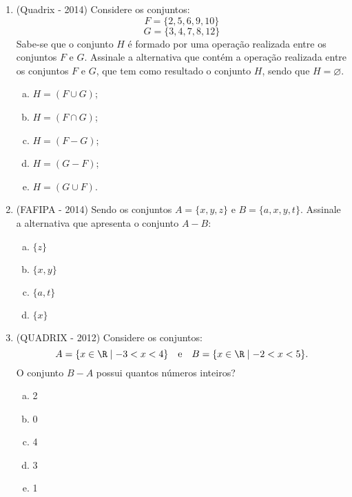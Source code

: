 \begin{enumerate}
  \item (Quadrix - 2014)  Considere os conjuntos:
      \[F = \{2, 5, 6, 9,10 \}\]
      \[G = \{3, 4, 7, 8, 12\}\]
 Sabe-se que o conjunto $H$ é formado por uma operação realizada entre os conjuntos $F$ e $G$. Assinale a alternativa que  contém a operação realizada entre os conjuntos $F$ e $G$, que tem como resultado o conjunto $H$, sendo que $H = \varnothing$.
 \begin{enumerate}[a)]
  \item $H= (F \cup G)$;
  \item $H= (F \cap G)$;
  \item $H= (F - G)$;
  \item $H= (G - F)$;
  \item $H= (G \cup F)$.
 \end{enumerate}

 \newpage
 \item (FAFIPA - 2014) Sendo os conjuntos $A = \{ x,y,z \}$ e $B =  \{a, x,y,t\}$. Assinale a alternativa que apresenta o conjunto $A - B$:
 \begin{multicols}{5}
 \begin{enumerate}[a)]
  \item $\{ z \}$
  \item $\{ x, y \}$
  \item $\{a, t\}$
  \item  $\{x\}$
 \end{enumerate}
 \end{multicols}

 \item (QUADRIX - 2012) Considere os conjuntos:
  \[ A = \{ x \in \R \mid - 3 < x < 4 \} \ \ \text{ e } \ \ B = \{ x \in \R \mid - 2 < x < 5 \}.\]
 O conjunto $B - A$ possui quantos números inteiros?
 \begin{multicols}{5}
 \begin{enumerate}[a)]
  \item 2
  \item 0
  \item 4
  \item 3
  \item 1
 \end{enumerate}
 \end{multicols}


\end{enumerate}
